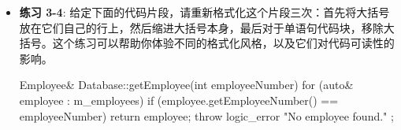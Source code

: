 \begin{itemize}
\item
\textbf{练习 3-4}: 给定下面的代码片段，请重新格式化这个片段三次：首先将大括号放在它们自己的行上，然后缩进大括号本身，最后对于单语句代码块，移除大括号。这个练习可以帮助你体验不同的格式化风格，以及它们对代码可读性的影响。

\begin{cpp}
Employee& Database::getEmployee(int employeeNumber)
{
    for (auto& employee : m_employees) {
        if (employee.getEmployeeNumber() == employeeNumber) {
            return employee;
        }
    }
    throw logic_error { "No employee found." };
}
\end{cpp}
\end{itemize}